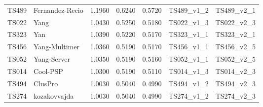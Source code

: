 \begin{table}[ht]
{\begin{tabular}{llrrrll}
TS489 & Fernandez-Recio & 1.1960 & 0.6240 & 0.5720 & TS489\_v1\_2 & TS489\_v2\_1 \\ 
TS022 & Yang & 1.0430 & 0.5250 & 0.5180 & TS022\_v1\_3 & TS022\_v2\_3 \\ 
TS323 & Yan & 1.0390 & 0.5220 & 0.5170 & TS323\_v1\_1 & TS323\_v2\_1 \\ 
TS456 & Yang-Multimer & 1.0360 & 0.5190 & 0.5170 & TS456\_v1\_1 & TS456\_v2\_5 \\ 
TS052 & Yang-Server & 1.0350 & 0.5190 & 0.5160 & TS052\_v1\_1 & TS052\_v2\_5 \\ 
TS014 & Cool-PSP & 1.0300 & 0.5190 & 0.5110 & TS014\_v1\_3 & TS014\_v2\_3 \\ 
TS494 & ClusPro & 1.0030 & 0.5040 & 0.4990 & TS494\_v1\_2 & TS494\_v2\_3 \\ 
TS274 & kozakovvajda & 1.0030 & 0.5040 & 0.4990 & TS274\_v1\_2 & TS274\_v2\_3 \\ 
\bottomrule
\end{tabular}%
}
\end{table}
